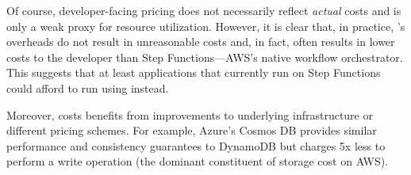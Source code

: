 %


Of course, developer-facing pricing does not necessarily reflect \emph{actual}
costs and is only a weak proxy for resource utilization. However, it is clear
that, in practice, \name{}'s overheads do not result in unreasonable costs and,
in fact, often results in lower costs to the developer than Step
Functions---AWS's native workflow orchestrator. This suggests that at least
applications that currently run on Step Functions could afford to run using
\name{} instead.

Moreover, \name{} costs benefits from improvements to underlying infrastructure
or different pricing schemes. For example, Azure's Cosmos DB provides similar
performance and consistency guarantees to DynamoDB but charges 5x less to
perform a write operation (the dominant constituent of \name{} storage cost on
AWS).



